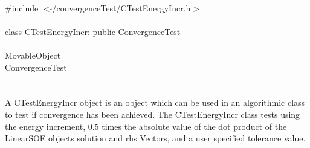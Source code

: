 
   \\
\indent \#include $<\tilde{}$/convergenceTest/CTestEnergyIncr.h$>$  \\

  \\
\indent class CTestEnergyIncr: public ConvergenceTest  \\

 \\
\indent MovableObject \\
\indent\indent ConvergenceTest \\
\indent\indent{} \\

  \\
\indent A CTestEnergyIncr object is an object which can be used in an
algorithmic class to test if convergence has been achieved. The
CTestEnergyIncr class tests using the energy increment, 0.5 times the
absolute value of the dot product of the LinearSOE objects solution
and rhs Vectors, and a user specified tolerance value. \\


 \\
\indent{}  \\ 
\indent{}  \\  
\indent{}  \\ \\
\indent{}  \\ 
\indent{} \\ \\
\indent{}  \\ 
\indent{} \\
\indent{} \\
\indent{} \\
\indent{} \\
\indent{}\\ 
\indent{}\\ 


